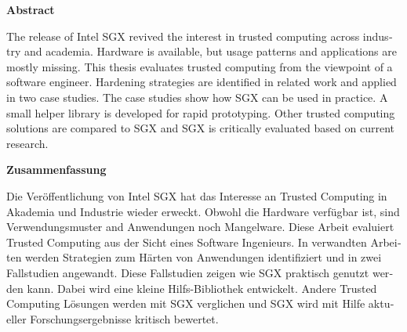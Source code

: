 
%
\begin{otherlanguage}{english}
\begin{center}\textsf{\textbf{Abstract}}\end{center}

\noindent
The release of Intel SGX revived the interest in trusted computing across industry and academia.
Hardware is available, but usage patterns and applications are mostly missing.
This thesis evaluates trusted computing from the viewpoint of a software engineer.
Hardening strategies are identified in related work and applied in two case studies.
The case studies show how SGX can be used in practice. A small helper library is developed for rapid prototyping.
Other trusted computing solutions are compared to SGX and SGX is critically evaluated based on current research.
\end{otherlanguage}

\vspace{2cm}



\begin{otherlanguage}{ngerman}
\begin{center}\textsf{\textbf{Zusammenfassung}}\end{center}

\noindent
Die Veröffentlichung von Intel SGX hat das Interesse an Trusted Computing in Akademia und Industrie wieder erweckt.
Obwohl die Hardware verfügbar ist, sind Verwendungsmuster and Anwendungen noch Mangelware.
Diese Arbeit evaluiert Trusted Computing aus der Sicht eines Software Ingenieurs.
In verwandten Arbeiten werden Strategien zum Härten von Anwendungen identifiziert und in zwei Fallstudien angewandt.
Diese Fallstudien zeigen wie SGX praktisch genutzt werden kann. Dabei wird eine kleine Hilfs-Bibliothek entwickelt.
Andere Trusted Computing Lösungen werden mit SGX verglichen und SGX wird mit Hilfe aktueller Forschungsergebnisse kritisch bewertet.
\end{otherlanguage}



